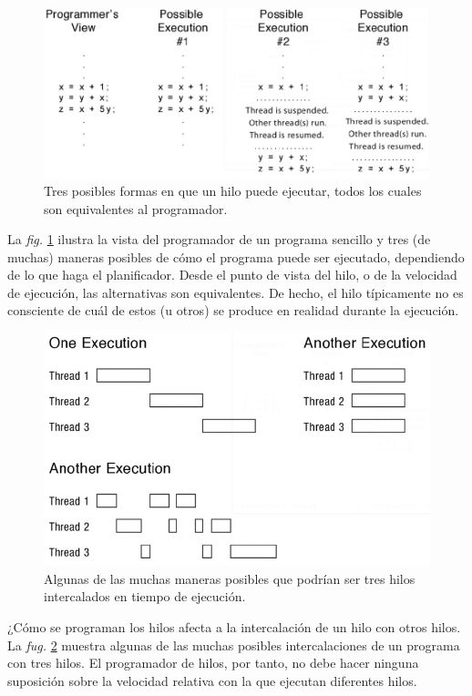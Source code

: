 \documentclass[10pt]{book}
\begin{document}
\begin{figure}[tbhp]
\centerline{\includegraphics[scale=0.45]{img/fig15}}
\caption{Tres posibles formas en que un hilo puede ejecutar, todos los cuales son equivalentes al programador.}
\label{fig15}
\end{figure}

La \textit{fig.} \ref{fig15} ilustra la vista del programador de un programa sencillo y tres (de muchas) maneras posibles de cómo el programa puede ser ejecutado, dependiendo de lo que haga el planificador. Desde el punto de vista del hilo, o de la velocidad de ejecución, las alternativas son equivalentes. De hecho, el hilo típicamente no es consciente de cuál de estos (u otros) se produce en realidad durante la ejecución.

\begin{figure}[tbhp]
\centerline{\includegraphics[scale=0.45]{img/fig16}}
\caption{Algunas de las muchas maneras posibles que podrían ser tres hilos intercalados en tiempo de ejecución.}
\label{fig16}
\end{figure}

¿Cómo se programan los hilos afecta a la intercalación de un hilo con otros hilos. La \textit{fug.} \ref{fig16} muestra algunas de las muchas posibles intercalaciones de un programa con tres hilos. El programador de hilos, por tanto, no debe hacer ninguna suposición sobre la velocidad relativa con la que ejecutan diferentes hilos.
\end{document}
